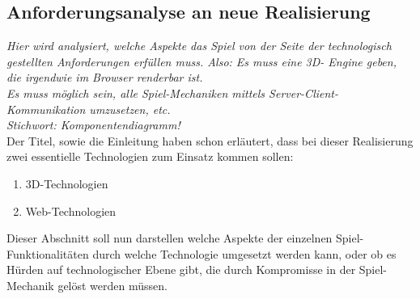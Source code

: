 \subsection{Anforderungsanalyse an neue Realisierung}
\label{subsec:neueReal_analyse}
\emph{Hier wird analysiert, welche Aspekte das Spiel von der Seite der technologisch gestellten Anforderungen erfüllen muss. Also: Es muss eine 3D- Engine geben, die irgendwie im Browser renderbar ist.\\ Es muss möglich sein, alle Spiel-Mechaniken mittels Server-Client-Kommunikation umzusetzen, etc.\\Stichwort: Komponentendiagramm!}\\
Der Titel, sowie die Einleitung haben schon erläutert, dass bei dieser Realisierung zwei essentielle Technologien zum Einsatz kommen sollen: 
\begin{enumerate}
	\item 3D-Technologien
	\item Web-Technologien
\end{enumerate}
Dieser Abschnitt soll nun darstellen welche Aspekte der einzelnen Spiel-Funktionalitäten durch welche Technologie umgesetzt werden kann, oder ob es \evtl Hürden auf technologischer Ebene gibt, die durch Kompromisse in der Spiel-Mechanik gelöst werden müssen.\\
